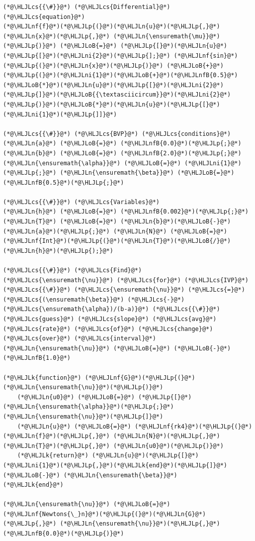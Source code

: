 \documentclass[12pt,a4paper]{article}
\newcommand{\HLJLk}[1]{\textcolor[RGB]{148,91,176}{\textbf{#1}}}
\newcommand{\HLJLn}[1]{#1}
\newcommand{\HLJLnf}[1]{\textcolor[RGB]{66,102,213}{#1}}
\newcommand{\HLJLnfB}[1]{\textcolor[RGB]{59,151,46}{#1}}
\newcommand{\HLJLni}[1]{\textcolor[RGB]{59,151,46}{#1}}
\newcommand{\HLJLoB}[1]{\textcolor[RGB]{102,102,102}{\textbf{#1}}}
\newcommand{\HLJLp}[1]{#1}
\newcommand{\HLJLcs}[1]{\textcolor[RGB]{153,153,119}{\textit{#1}}}
\begin{document}
\begin{lstlisting}
(*@\HLJLcs{{\#}}@*) (*@\HLJLcs{Differential}@*) (*@\HLJLcs{equation}@*)
(*@\HLJLnf{f}@*)(*@\HLJLp{(}@*)(*@\HLJLn{u}@*)(*@\HLJLp{,}@*) (*@\HLJLn{x}@*)(*@\HLJLp{,}@*) (*@\HLJLn{\ensuremath{\mu}}@*)(*@\HLJLp{)}@*) (*@\HLJLoB{=}@*) (*@\HLJLp{[}@*)(*@\HLJLn{u}@*)(*@\HLJLp{[}@*)(*@\HLJLni{2}@*)(*@\HLJLp{];}@*) (*@\HLJLnf{sin}@*)(*@\HLJLp{(}@*)(*@\HLJLn{x}@*)(*@\HLJLp{)}@*) (*@\HLJLoB{+}@*) (*@\HLJLp{(}@*)(*@\HLJLni{1}@*)(*@\HLJLoB{+}@*)(*@\HLJLnfB{0.5}@*)(*@\HLJLoB{*}@*)(*@\HLJLn{u}@*)(*@\HLJLp{[}@*)(*@\HLJLni{2}@*)(*@\HLJLp{]}@*)(*@\HLJLoB{{\textasciicircum}}@*)(*@\HLJLni{2}@*)(*@\HLJLp{)}@*)(*@\HLJLoB{*}@*)(*@\HLJLn{u}@*)(*@\HLJLp{[}@*)(*@\HLJLni{1}@*)(*@\HLJLp{]]}@*)

(*@\HLJLcs{{\#}}@*) (*@\HLJLcs{BVP}@*) (*@\HLJLcs{conditions}@*)
(*@\HLJLn{a}@*) (*@\HLJLoB{=}@*) (*@\HLJLnfB{0.0}@*)(*@\HLJLp{;}@*) (*@\HLJLn{b}@*) (*@\HLJLoB{=}@*) (*@\HLJLnfB{2.0}@*)(*@\HLJLp{;}@*) (*@\HLJLn{\ensuremath{\alpha}}@*) (*@\HLJLoB{=}@*) (*@\HLJLni{1}@*)(*@\HLJLp{;}@*) (*@\HLJLn{\ensuremath{\beta}}@*) (*@\HLJLoB{=}@*) (*@\HLJLnfB{0.5}@*)(*@\HLJLp{;}@*)

(*@\HLJLcs{{\#}}@*) (*@\HLJLcs{Variables}@*)
(*@\HLJLn{h}@*) (*@\HLJLoB{=}@*) (*@\HLJLnfB{0.002}@*)(*@\HLJLp{;}@*) (*@\HLJLn{T}@*) (*@\HLJLoB{=}@*) (*@\HLJLn{b}@*)(*@\HLJLoB{-}@*)(*@\HLJLn{a}@*)(*@\HLJLp{;}@*) (*@\HLJLn{N}@*) (*@\HLJLoB{=}@*) (*@\HLJLnf{Int}@*)(*@\HLJLp{(}@*)(*@\HLJLn{T}@*)(*@\HLJLoB{/}@*)(*@\HLJLn{h}@*)(*@\HLJLp{);}@*)

(*@\HLJLcs{{\#}}@*) (*@\HLJLcs{Find}@*) (*@\HLJLcs{\ensuremath{\nu}}@*) (*@\HLJLcs{for}@*) (*@\HLJLcs{IVP}@*)
(*@\HLJLcs{{\#}}@*) (*@\HLJLcs{\ensuremath{\nu}}@*) (*@\HLJLcs{=}@*) (*@\HLJLcs{(\ensuremath{\beta}}@*) (*@\HLJLcs{-}@*) (*@\HLJLcs{\ensuremath{\alpha})/(b-a)}@*) (*@\HLJLcs{{\#}}@*) (*@\HLJLcs{guess}@*) (*@\HLJLcs{slope}@*) (*@\HLJLcs{avg}@*) (*@\HLJLcs{rate}@*) (*@\HLJLcs{of}@*) (*@\HLJLcs{change}@*) (*@\HLJLcs{over}@*) (*@\HLJLcs{interval}@*)
(*@\HLJLn{\ensuremath{\nu}}@*) (*@\HLJLoB{=}@*) (*@\HLJLoB{-}@*)(*@\HLJLnfB{1.0}@*)

(*@\HLJLk{function}@*) (*@\HLJLnf{G}@*)(*@\HLJLp{(}@*)(*@\HLJLn{\ensuremath{\nu}}@*)(*@\HLJLp{)}@*)
    (*@\HLJLn{u0}@*) (*@\HLJLoB{=}@*) (*@\HLJLp{[}@*)(*@\HLJLn{\ensuremath{\alpha}}@*)(*@\HLJLp{;}@*) (*@\HLJLn{\ensuremath{\nu}}@*)(*@\HLJLp{]}@*)
    (*@\HLJLn{u}@*) (*@\HLJLoB{=}@*) (*@\HLJLnf{rk4}@*)(*@\HLJLp{(}@*)(*@\HLJLn{f}@*)(*@\HLJLp{,}@*) (*@\HLJLn{N}@*)(*@\HLJLp{,}@*) (*@\HLJLn{T}@*)(*@\HLJLp{,}@*) (*@\HLJLn{u0}@*)(*@\HLJLp{)}@*)
    (*@\HLJLk{return}@*) (*@\HLJLn{u}@*)(*@\HLJLp{[}@*)(*@\HLJLni{1}@*)(*@\HLJLp{,}@*)(*@\HLJLk{end}@*)(*@\HLJLp{]}@*) (*@\HLJLoB{-}@*) (*@\HLJLn{\ensuremath{\beta}}@*)
(*@\HLJLk{end}@*)

(*@\HLJLn{\ensuremath{\nu}}@*) (*@\HLJLoB{=}@*) (*@\HLJLnf{Newtons{\_}n}@*)(*@\HLJLp{(}@*)(*@\HLJLn{G}@*)(*@\HLJLp{,}@*) (*@\HLJLn{\ensuremath{\nu}}@*)(*@\HLJLp{,}@*) (*@\HLJLnfB{0.0}@*)(*@\HLJLp{)}@*)
\end{lstlisting}
\end{document}
